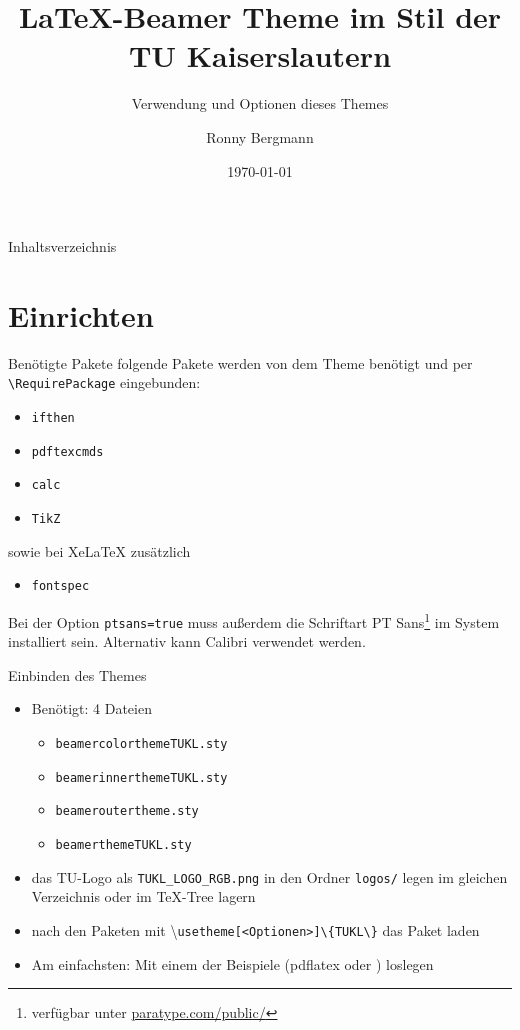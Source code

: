 \documentclass[german,10pt,xcolor=colortbl,compress
]{beamer}
\title{\LaTeX-Beamer Theme im Stil der TU Kaiserslautern}
\subtitle{Verwendung und Optionen dieses Themes}
\date[]{\today}
\author[R. Bergmann]{Ronny Bergmann}
\institute[]{AG Bildverarbeitung\\FB Mathematik\\TU Kaiserslautern}
\begin{document}
	\maketitle
	\begin{frame}{Inhaltsverzeichnis}
		\tableofcontents
	\end{frame}
	\section{Einrichten}
	\begin{frame}[fragile]{Benötigte Pakete}
		folgende Pakete werden von dem Theme benötigt und per \lstinline!\RequirePackage! eingebunden:
		\begin{itemize}
			\item \lstinline!ifthen!
			\item \lstinline!pdftexcmds!
			\item \lstinline!calc!
			\item \lstinline!TikZ!
		\end{itemize}\vspace{\baselineskip}
		sowie bei XeLaTeX zusätzlich
		\begin{itemize}
			\item \lstinline!fontspec!
		\end{itemize}\vspace{\baselineskip}
		Bei der Option \lstinline!ptsans=true! muss außerdem die Schriftart PT Sans\footnote{verfügbar unter \href{http://www.paratype.com/public/}{paratype.com/public/}} im System installiert sein. Alternativ kann Calibri verwendet werden.
	\end{frame}
	\begin{frame}{Einbinden des Themes}
		\begin{itemize}
			\item Benötigt: 4 Dateien
			\begin{itemize}
				\item \lstinline|beamercolorthemeTUKL.sty|
				\item \lstinline|beamerinnerthemeTUKL.sty|
				\item \lstinline!beameroutertheme.sty!
				\item \lstinline|beamerthemeTUKL.sty| 
			\end{itemize}
			\item das TU-Logo als \lstinline!TUKL_LOGO_RGB.png! in den Ordner \lstinline!logos/! legen
			 im gleichen Verzeichnis oder im \TeX-Tree lagern
			\item nach den Paketen mit \textbackslash\lstinline|usetheme[<Optionen>]\{TUKL\}| das Paket laden
			\item Am einfachsten: Mit einem der Beispiele (pdflatex oder \XeLaTeX) loslegen
		\end{itemize}
	\end{frame}
\end{document}
